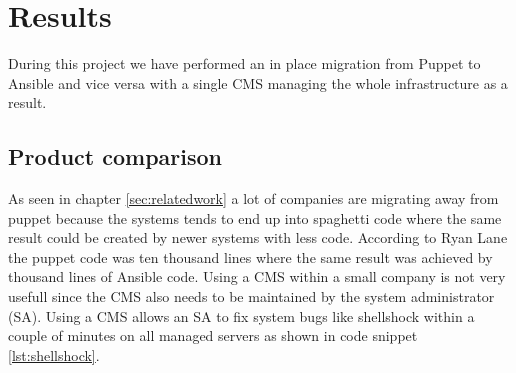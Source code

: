 \section{Results}\label{sec:results}
During this project we have performed an in place migration from Puppet to Ansible and vice versa with a single CMS managing the whole infrastructure as a result.

\subsection{Product comparison}

As seen in chapter \ref{sec:relatedwork} a lot of companies are migrating away from puppet because the systems tends to end up into spaghetti code \cite{movingawayfrompuppet} where the same result could be created by newer systems with less code. According to Ryan Lane \cite{movingawayfrompuppet} the puppet code was ten thousand lines where the same result was achieved by thousand lines of Ansible code. Using a CMS within a small company is not very usefull since the CMS also needs to be maintained by the system administrator (SA). Using a CMS allows an SA to fix system bugs like shellshock within a couple of minutes on all managed servers as shown in code snippet \ref{lst:shellshock}.

